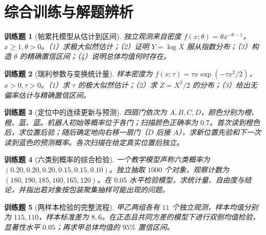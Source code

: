 \documentclass[UTF8,12pt,a4paper,fontset=fandol]{ctexbook}
\newtheorem{exercise}{训练题}[section]
\begin{document}
\clearpage\section{综合训练与解题辨析}

\begin{exercise}[帕累托模型从估计到区间]\label{q:M-F-5}
独立观测来自密度 $f(x;\theta)=\theta x^{-\theta-1}$，$x\ge1,\theta>0$。（1）求极大似然估计；（2）证明 $Y=\log X$ 服从指数分布；（3）构造 $\theta$ 的精确置信区间；（4）说明总体均值何时存在。\par{}\end{exercise}

\begin{exercise}[瑞利参数与变换统计量]\label{q:M-PF-26}
样本密度为 $f(x;\tau)=\tau x\exp(-\tau x^2/2)$，$x>0,\tau>0$。（1）求 $\tau$ 的极大似然估计；（2）求 $Z=X^2/2$ 的分布；（3）给出无偏率估计与精确置信区间。\par{}\end{exercise}

\begin{exercise}[定位中的连续更新与预测]\label{q:M-F-7}
四扇门依次为 $A,B,C,D$，颜色分别为橙、橙、蓝、蓝。机器人初始等概率位于各门；扫描颜色正确率为 $0.7$。首次读到橙色后，求位置后验；随后确定地向右移一扇门（$D$ 后接 $A$），求新位置先验和下一次读到蓝色的预测概率。各次扫描在给定真实位置后独立。\par{}\end{exercise}

\begin{exercise}[六类别概率的综合检验]\label{q:M-F-8}
一个教学模型声称六类概率为 $(0.20,0.20,0.20,0.15,0.15,0.10)$。独立抽取 $1000$ 个对象，观察计数为 $(180,190,185,\allowbreak160,165,120)$。在 $0.05$ 水平检验模型，求统计量、自由度与结论，并指出若对象按包装聚集抽样可能出现的问题。\par{}\end{exercise}

\begin{exercise}[两样本检验的完整流程]\label{q:M-F-9}
甲乙两组各有 $11$ 个独立观测，样本均值分别为 $115,110$，样本标准差为 $8,6$。在正态且共同方差的模型下进行双侧均值检验，显著性水平 $0.05$；再求甲总体均值的 $95\%$ 置信区间。\par{}\end{exercise}
\end{document}
